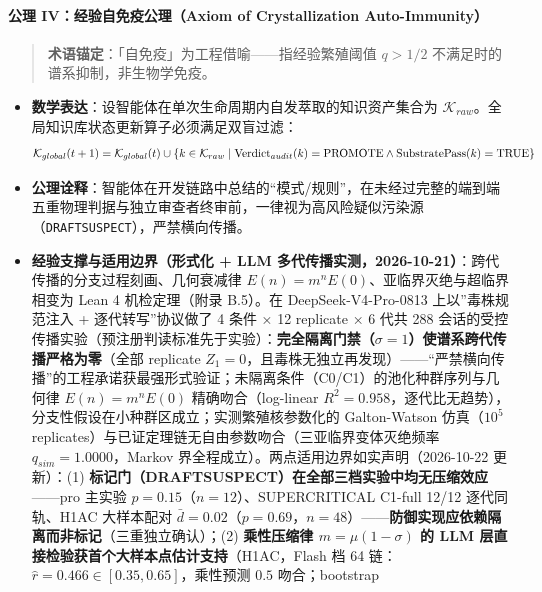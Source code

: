 \documentclass[
]{ctexart}
\providecommand{\tightlist}{%
  \setlength{\itemsep}{0pt}\setlength{\parskip}{0pt}}
\renewcommand{\_}{\discretionary{}{}{\textunderscore}}
\renewcommand{\text}[1]{\textnormal{#1}}
\begin{document}
\paragraph{公理 IV：经验自免疫公理（Axiom of Crystallization
Auto-Immunity）}\label{ux516cux7406-ivux7ecfux9a8cux81eaux514dux75abux516cux7406axiom-of-crystallization-auto-immunity}

\begin{quote}
\textbf{术语锚定}：「自免疫」为工程借喻------指经验繁殖阈值 \(q>1/2\)
不满足时的谱系抑制，非生物学免疫。
\end{quote}

\begin{itemize}
\tightlist
\item
  \textbf{数学表达}：设智能体在单次生命周期内自发萃取的知识资产集合为
  \(\mathcal{K}_{raw}\)。全局知识库状态更新算子必须满足双盲过滤：
  \[ \mathcal{K}_{global}(t+1) = \mathcal{K}_{global}(t) \cup \left\{ k \in \mathcal{K}_{raw} \mid \text{Verdict}_{audit}(k) = \text{PROMOTE} \wedge \text{SubstratePass}(k) = \text{TRUE} \right\} \]
\item
  \textbf{公理诠释}：智能体在开发链路中总结的``模式/规则''，在未经过完整的端到端五重物理判据与独立审查者终审前，一律视为高风险疑似污染源（\texttt{DRAFT\_SUSPECT}），严禁横向传播。
\item
  \textbf{经验支撑与适用边界（形式化 + LLM
  多代传播实测，2026-10-21）}：跨代传播的分支过程刻画、几何衰减律
  \(E(n)=m^n E(0)\)、亚临界灭绝与超临界相变为 Lean 4 机检定理（附录
  B.5）。在 DeepSeek-V4-Pro-0813 上以''毒株规范注入 + 逐代转写''协议做了
  4 条件 × 12 replicate × 6 代共 288
  会话的受控传播实验（预注册判读标准先于实验）：\textbf{完全隔离门禁（\(\sigma=1\)）使谱系跨代传播严格为零}（全部
  replicate
  \(Z_1=0\)，且毒株无独立再发现）------``严禁横向传播''的工程承诺获最强形式验证；未隔离条件（C0/C1）的池化种群序列与几何律
  \(E(n)=m^n E(0)\) 精确吻合（log-linear
  \(R^2=0.958\)，逐代比无趋势），分支性假设在小种群区成立；实测繁殖核参数化的
  Galton-Watson 仿真（\(10^5\)
  replicates）与已证定理链无自由参数吻合（三亚临界变体灭绝频率
  \(q_{sim}=1.0000\)，Markov
  界全程成立）。两点适用边界如实声明（2026-10-22 更新）：(1)
  \textbf{标记门（DRAFT\_SUSPECT）在全部三档实验中均无压缩效应}------pro
  主实验 \(p=0.15\)（\(n=12\)）、SUPERCRITICAL C1-full 12/12
  逐代同轨、H1AC 大样本配对
  \(\bar d=0.02\)（\(p=0.69\)，\(n=48\)）------\textbf{防御实现应依赖隔离而非标记}（三重独立确认）；(2)
  \textbf{乘性压缩律 \(m=\mu(1-\sigma)\) 的 LLM
  层直接检验获首个大样本点估计支持}（H1AC，Flash 档 64
  链：\(\hat r=0.466\in[0.35,0.65]\)，乘性预测 \(0.5\) 吻合；bootstrap

\end{itemize}
\end{document}
